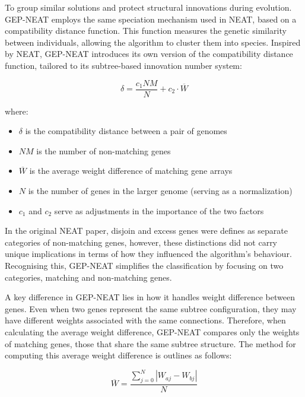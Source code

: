 \parbreak\noindent To group similar solutions and protect structural innovations during evolution. GEP-NEAT employs the same speciation mechanism used in NEAT, based on a compatibility distance function. This function measures the genetic similarity between individuals, allowing the algorithm to cluster them into species. Inspired by NEAT, GEP-NEAT introduces its own version of the compatibility distance function, tailored to its subtree-based innovation number system:
\begin{ceqn}
	\begin{equation}\label{alg:speciation}
		\delta = \frac{c_1NM}{N} + c_2\cdot{\overline{W}}
	\end{equation}
\end{ceqn}

\noindent where:
\begin{itemize}
    \item $\delta$ is the compatibility distance between a pair of genomes
    \item $NM$ is the number of non-matching genes
    \item $\overline{W}$ is the average weight difference of matching gene arrays
    \item $N$ is the number of genes in the larger genome (serving as a normalization)
    \item $c_1$ and $c_2$ serve as adjustments in the importance of the two factors
\end{itemize}

\parbreak\noindent In the original NEAT paper, disjoin and excess genes were defines as separate categories of non-matching genes, however, these distinctions did not carry unique implications in terms of how they influenced the algorithm's behaviour. Recognising this, GEP-NEAT simplifies the classification by focusing on two categories, matching and non-matching genes.

\parbreak\noindent A key difference in GEP-NEAT lies in how it handles weight difference between genes. Even when two genes represent the same subtree configuration, they may have different weights associated with the same connections. Therefore, when calculating the average weight difference, GEP-NEAT compares only the weights of matching genes, those that share the same subtree structure. The method for computing this average weight difference is outlines as follows:
\begin{ceqn}
	\begin{equation}\label{alg:weight_difference}
		\overline{W} = \frac{\sum_{j=0}^{N}|W_{aj} - W_{bj}|}{N}
	\end{equation}
\end{ceqn}

